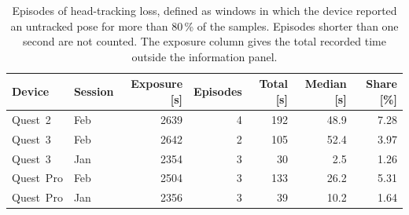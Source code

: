 \begin{table}[t]
\caption{Episodes of head-tracking loss, defined as windows in which the device reported an untracked pose for more than 80\,\% of the samples. Episodes shorter than one second are not counted. The exposure column gives the total recorded time outside the information panel.}\label{tab:episodes}
\begin{tabular}{llrrrrr}
\toprule
Device & Session & Exposure [s] & Episodes & Total [s] & Median [s] & Share [\%] \\
\midrule
Quest~2 & Feb & 2639 & 4 & 192 & 48.9 & 7.28 \\
Quest~3 & Feb & 2642 & 2 & 105 & 52.4 & 3.97 \\
Quest~3 & Jan & 2354 & 3 & 30 & 2.5 & 1.26 \\
Quest~Pro & Feb & 2504 & 3 & 133 & 26.2 & 5.31 \\
Quest~Pro & Jan & 2356 & 3 & 39 & 10.2 & 1.64 \\
\bottomrule
\end{tabular}
\end{table}